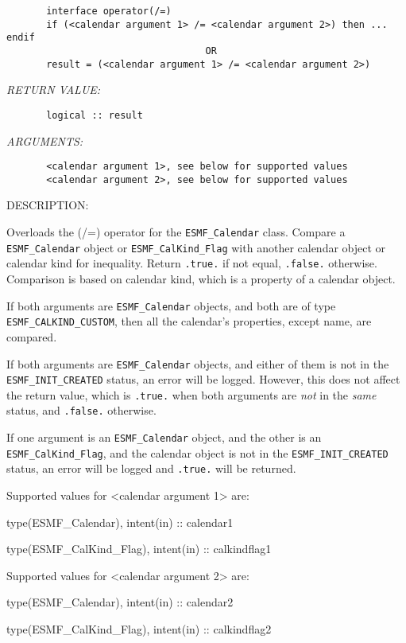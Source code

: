  
\begin{verbatim}       interface operator(/=)
       if (<calendar argument 1> /= <calendar argument 2>) then ... endif
                                   OR
       result = (<calendar argument 1> /= <calendar argument 2>)\end{verbatim}{\em RETURN VALUE:}
\begin{verbatim}       logical :: result\end{verbatim}{\em ARGUMENTS:}
\begin{verbatim}       <calendar argument 1>, see below for supported values
       <calendar argument 2>, see below for supported values\end{verbatim}
{\sf DESCRIPTION:\\ }


       \begin{sloppypar}
       Overloads the (/=) operator for the {\tt ESMF\_Calendar} class.
       Compare a {\tt ESMF\_Calendar} object or {\tt ESMF\_CalKind\_Flag} with
       another calendar object or calendar kind for inequality.  Return
       {\tt .true.} if not equal, {\tt .false.} otherwise.  Comparison is based
       on calendar kind, which is a property of a calendar object.
       \end{sloppypar}
  
       If both arguments are {\tt ESMF\_Calendar} objects, and both are of  
       type {\tt ESMF\_CALKIND\_CUSTOM}, then all the calendar's properties,
       except name, are compared.
  
       If both arguments are {\tt ESMF\_Calendar} objects, and either of them
       is not in the {\tt ESMF\_INIT\_CREATED} status, an error will be logged.
       However, this does not affect the return value, which is {\tt .true.} 
       when both arguments are {\em not} in the {\em same} status, and
       {\tt .false.} otherwise.
  
       If one argument is an {\tt ESMF\_Calendar} object, and the other is an
       {\tt ESMF\_CalKind\_Flag}, and the calendar object is not in the
       {\tt ESMF\_INIT\_CREATED} status, an error will be logged and
       {\tt .true.} will be returned.
  
       Supported values for <calendar argument 1> are:
       \begin{description}
       \item type(ESMF\_Calendar),     intent(in) :: calendar1
       \item type(ESMF\_CalKind\_Flag), intent(in) :: calkindflag1
       \end{description}
       Supported values for <calendar argument 2> are:
       \begin{description}
       \item type(ESMF\_Calendar),     intent(in) :: calendar2
       \item type(ESMF\_CalKind\_Flag), intent(in) :: calkindflag2
       \end{description}
  
